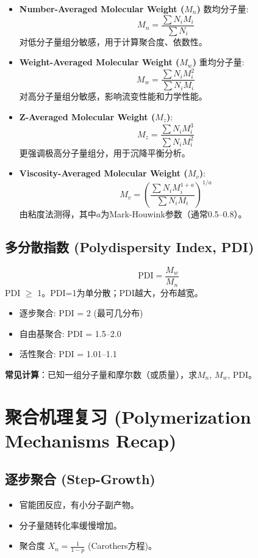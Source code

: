 \documentclass[12pt,a4paper]{ctexart}
\begin{document}
\begin{itemize}
    \item \textbf{Number-Averaged Molecular Weight ($M_n$)} 数均分子量:
    \[
    M_n = \frac{\sum N_i M_i}{\sum N_i}
    \]
    对低分子量组分敏感，用于计算聚合度、依数性。
    
    \item \textbf{Weight-Averaged Molecular Weight ($M_w$)} 重均分子量:
    \[
    M_w = \frac{\sum N_i M_i^2}{\sum N_i M_i}
    \]
    对高分子量组分敏感，影响流变性能和力学性能。
    
    \item \textbf{Z-Averaged Molecular Weight ($M_z$)}:
    \[
    M_z = \frac{\sum N_i M_i^3}{\sum N_i M_i^2}
    \]
    更强调极高分子量组分，用于沉降平衡分析。
    
    \item \textbf{Viscosity-Averaged Molecular Weight ($M_v$)}:
    \[
    M_v = \left( \frac{\sum N_i M_i^{1+a}}{\sum N_i M_i} \right)^{1/a}
    \]
    由粘度法测得，其中$a$为Mark-Houwink参数（通常0.5–0.8）。
\end{itemize}

\subsection{多分散指数 (Polydispersity Index, PDI)}
\[
\text{PDI} = \frac{M_w}{M_n}
\]
PDI $\ge$ 1。PDI=1为单分散；PDI越大，分布越宽。

\begin{itemize}
    \item 逐步聚合: PDI = 2 (最可几分布)
    \item 自由基聚合: PDI = 1.5–2.0
    \item 活性聚合: PDI = 1.01–1.1
\end{itemize}

\textbf{常见计算}：已知一组分子量和摩尔数（或质量），求$M_n$, $M_w$, PDI。

\section{聚合机理复习 (Polymerization Mechanisms Recap)}

\subsection{逐步聚合 (Step-Growth)}
\begin{itemize}
    \item 官能团反应，有小分子副产物。
    \item 分子量随转化率缓慢增加。
    \item 聚合度 $X_n = \frac{1}{1-p}$ (Carothers方程)。
\end{itemize}
\end{document}
